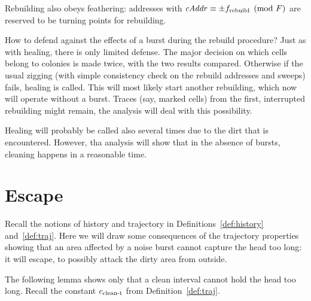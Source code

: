 \documentclass[12pt]{memoir}
\newcommand{\fld}[1]{\ensuremath{\textit{#1\/}}}
\newcommand{\tRebuild}{f_{\mathrm{rebuild}}}
\newcommand{\F}{F}
\newcommand{\cAddr}{\fld{cAddr}}
\newcommand{\cns}[1]{c_{\textrm{\upshape #1}}}
\newcommand{\cCleanT}{\cns{clean-t}}
\begin{document}
Rebuilding also obeys feathering: addresses with \( \cAddr\equiv\pm \tRebuild\pmod{\F} \)
are reserved to be turning points for rebuilding.

How to defend against the effects of a burst during the rebuild procedure?
Just as with healing, there is only limited defense.
The major decision on which cells belong to colonies is made twice, with the
two results compared.
Otherwise if the usual zigging (with simple consistency check on the rebuild addresses
and sweeps) fails, healing is called.
This will most likely start another rebuilding, which now will operate without a burst.
Traces (say, marked cells) from the first, interrupted rebuilding might remain,
the analysis will deal with this possibility.

Healing will probably be called also several times due to the dirt that is encountered.
However, tha analysis will show that in the absence of bursts, cleaning happens
in a reasonable time.


\section{Escape}\label{sec:escape}

Recall the notions of history and trajectory in Definitions~\ref{def:history} 
and~\ref{def:traj}.
Here we will draw some consequences of the trajectory properties
showing that an area affected by a noise burst cannot
capture the head too long: it will escape, to possibly attack the dirty area
from outside.

The following lemma shows only that a clean interval cannot hold the head 
too long.
Recall the constant \( \cCleanT \) from Definition~\ref{def:traj}.
\end{document}

